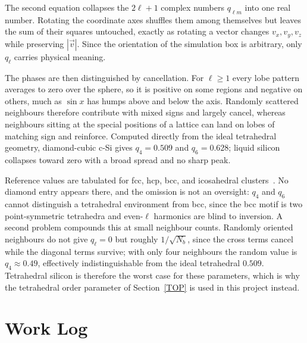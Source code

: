 \documentclass{article}
\begin{document}
The second equation collapses the $2\ell+1$ complex numbers $q_{\ell m}$ into one real number. Rotating the coordinate axes shuffles them among themselves but leaves the sum of their squares untouched, exactly as rotating a vector changes $v_x, v_y, v_z$ while preserving $|\vec{v}|$. Since the orientation of the simulation box is arbitrary, only $q_\ell$ carries physical meaning.

The phases are then distinguished by cancellation. For $\ell \geq 1$ every lobe pattern averages to zero over the sphere, so it is positive on some regions and negative on others, much as $\sin x$ has humps above and below the axis. Randomly scattered neighbours therefore contribute with mixed signs and largely cancel, whereas neighbours sitting at the special positions of a lattice can land on lobes of matching sign and reinforce. Computed directly from the ideal tetrahedral geometry, diamond-cubic c-Si gives $q_4 = 0.509$ and $q_6 = 0.628$; liquid silicon collapses toward zero with a broad spread and no sharp peak.

Reference values are tabulated for fcc, hcp, bcc, and icosahedral clusters~\cite{steinhardt1983}. No diamond entry appears there, and the omission is not an oversight: $q_4$ and $q_6$ cannot distinguish a tetrahedral environment from bcc, since the bcc motif is two point-symmetric tetrahedra and even-$\ell$ harmonics are blind to inversion. A second problem compounds this at small neighbour counts. Randomly oriented neighbours do not give $q_\ell = 0$ but roughly $1/\sqrt{N_b}$, since the cross terms cancel while the diagonal terms survive; with only four neighbours the random value is $q_4 \approx 0.49$, effectively indistinguishable from the ideal tetrahedral $0.509$. Tetrahedral silicon is therefore the worst case for these parameters, which is why the tetrahedral order parameter of Section~\ref{TOP} is used in this project instead.

\section{Work Log}
\label{sec:worklog}
\end{document}
